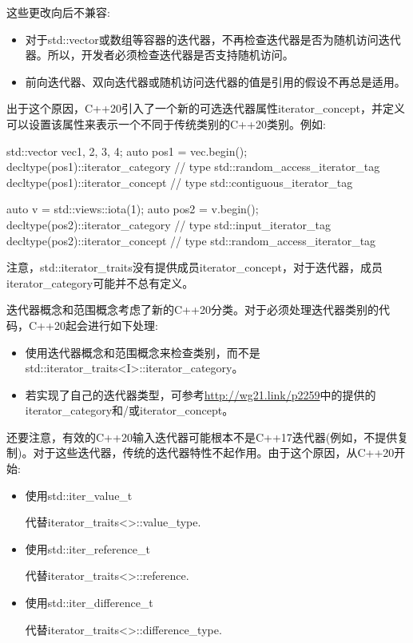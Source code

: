 这些更改向后不兼容:

\begin{itemize}
\item
对于std::vector或数组等容器的迭代器，不再检查迭代器是否为随机访问迭代器。所以，开发者必须检查迭代器是否支持随机访问。

\item
前向迭代器、双向迭代器或随机访问迭代器的值是引用的假设不再总是适用。
\end{itemize}

出于这个原因，C++20引入了一个新的可选迭代器属性iterator\_concept，并定义可以设置该属性来表示一个不同于传统类别的C++20类别。例如:

\begin{cpp}
std::vector vec{1, 2, 3, 4};
auto pos1 = vec.begin();
decltype(pos1)::iterator_category // type std::random_access_iterator_tag
decltype(pos1)::iterator_concept // type std::contiguous_iterator_tag

auto v = std::views::iota(1);
auto pos2 = v.begin();
decltype(pos2)::iterator_category // type std::input_iterator_tag
decltype(pos2)::iterator_concept // type std::random_access_iterator_tag
\end{cpp}

注意，std::iterator\_traits没有提供成员iterator\_concept，对于迭代器，成员iterator\_category可能并不总有定义。

迭代器概念和范围概念考虑了新的C++20分类。对于必须处理迭代器类别的代码，C++20起会进行如下处理:

\begin{itemize}
\item
使用迭代器概念和范围概念来检查类别，而不是std::iterator\_traits<I>::iterator\_category。

\item
若实现了自己的迭代器类型，可参考\url{http://wg21.link/p2259}中的提供的iterator\_category和/或iterator\_concept。
\end{itemize}

还要注意，有效的C++20输入迭代器可能根本不是C++17迭代器(例如，不提供复制)。对于这些迭代器，传统的迭代器特性不起作用。由于这个原因，从C++20开始:

\begin{itemize}
\item
使用std::iter\_value\_t

代替iterator\_traits<>::value\_type.

\item
使用std::iter\_reference\_t

代替iterator\_traits<>::reference.

\item
使用std::iter\_difference\_t

代替iterator\_traits<>::difference\_type.
\end{itemize}





















